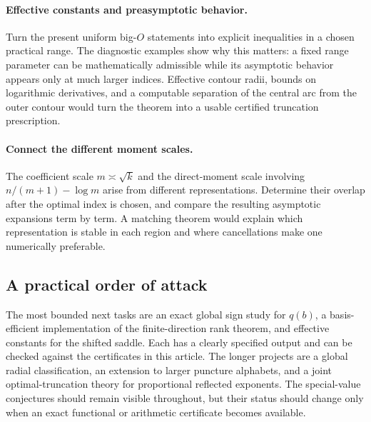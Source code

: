 \paragraph{Effective constants and preasymptotic behavior.}
Turn the present uniform big-$O$ statements into explicit
inequalities in a chosen practical range. The diagnostic
examples show why this matters: a fixed range parameter
can be mathematically admissible while its asymptotic
behavior appears only at much larger indices.
Effective contour radii, bounds on logarithmic derivatives,
and a computable separation of the central arc from the
outer contour would turn the theorem into a usable
certified truncation prescription.

\paragraph{Connect the different moment scales.}
The coefficient scale $m\asymp\sqrt{k}$ and the direct-moment
scale involving $n/(m+1)-\log m$ arise from different
representations. Determine their overlap after the
optimal index is chosen, and compare the resulting
asymptotic expansions term by term. A matching theorem
would explain which representation is stable in each
region and where cancellations make one numerically
preferable.

\subsection{A practical order of attack}

The most bounded next tasks are an exact global sign study
for $q(b)$, a basis-efficient implementation of the finite-direction
rank theorem, and effective constants for the shifted saddle.
Each has a clearly specified output and can be checked
against the certificates in this article. The longer
projects are a global radial classification, an extension
to larger puncture alphabets, and a joint optimal-truncation
theory for proportional reflected exponents. The special-value
conjectures should remain visible throughout, but their
status should change only when an exact functional or
arithmetic certificate becomes available.
